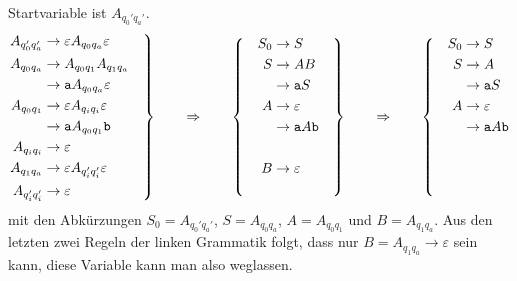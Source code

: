 \begin{loesung}
Startvariable ist $A_{q_0'q_a'}$.
\[
\left.
\begin{aligned}
A_{q_0'q_a'} & \to \varepsilon A_{q_0q_a}\varepsilon  \\
A_{q_0q_a}   & \to A_{q_0q_1}A_{q_1q_a} \\
             & \to \texttt{a} A_{q_0q_a}\varepsilon \\
A_{q_0q_1}   & \to \varepsilon A_{q_iq_i}\varepsilon  \\
             & \to \texttt{a} A_{q_0q_1} \texttt{b} \\
A_{q_iq_i}   & \to \varepsilon \\
A_{q_1q_a}   & \to \varepsilon A_{q_i'q_i'}\varepsilon  \\
A_{q_i'q_i'} & \to \varepsilon \\
\end{aligned}
\quad
\right\}
\qquad\Rightarrow\qquad
\left\{
\quad
\begin{aligned}
S_0 & \to S \\
S   & \to AB \\
    & \to \texttt{a} S  \\
A   & \to \varepsilon \\
    & \to \texttt{a} A \texttt{b} \\
    &\mathstrut \\
B   & \to \varepsilon \\
    &\mathstrut \\
\end{aligned}
\quad
\right\}
\qquad\Rightarrow\qquad
\left\{
\quad
\begin{aligned}
S_0 & \to S \\
S   & \to A \\
    & \to \texttt{a} S  \\
A   & \to \varepsilon \\
    & \to \texttt{a} A \texttt{b} \\
    &\mathstrut \\
    &\mathstrut \\
    &\mathstrut \\
\end{aligned}
\right.
\]
mit den Abkürzungen $S_0=A_{q_0'q_a'}$, $S=A_{q_0q_a}$, $A=A_{q_0q_1}$
und $B=A_{q_1q_a}$.
Aus den letzten zwei Regeln der linken Grammatik folgt, dass
nur $B=A_{q_1q_a}\to \varepsilon$ sein kann, diese Variable kann man also
weglassen.
\end{loesung}



